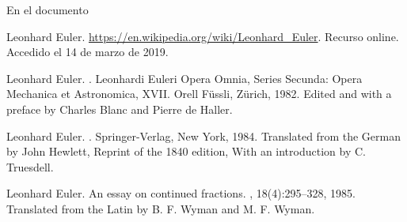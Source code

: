 \documentclass[a4paper, 12pt]{article}
\begin{document}
En el documento~\cite{EulerWiki}

\begin{thebibliography}{Eul85}

{L}eonhard {E}uler.
\newblock \url{https://en.wikipedia.org/wiki/Leonhard_Euler}.
\newblock Recurso online. Accedido el 14 de marzo de 2019.

Leonhard Euler.
.
\newblock Leonhardi Euleri Opera Omnia, Series Secunda: Opera Mechanica et
  Astronomica, XVII. Orell F\"{u}ssli, Z\"{u}rich, 1982.
\newblock Edited and with a preface by Charles Blanc and Pierre de Haller.

Leonhard Euler.
.
\newblock Springer-Verlag, New York, 1984.
\newblock Translated from the German by John Hewlett, Reprint of the 1840
  edition, With an introduction by C. Truesdell.

Leonhard Euler.
\newblock An essay on continued fractions.
, 18(4):295--328, 1985.
\newblock Translated from the Latin by B. F. Wyman and M. F. Wyman.

\end{thebibliography}
\end{document}
